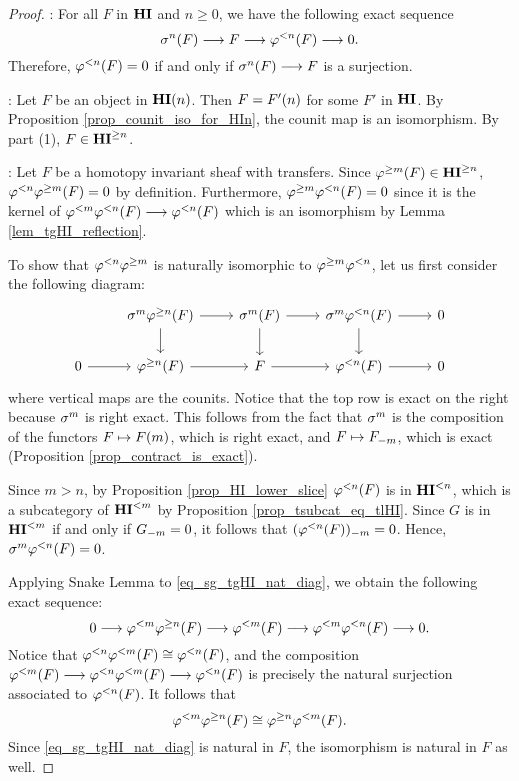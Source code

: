 \begin{proof}
 : For all $F$ in $\HI$ and $n \geq 0$, we have the 
following exact sequence
\[
\sgHI{n}(F) \to F \to \tlHI{n}(F) \to 0.
\]
Therefore, $\tlHI{n}(F) = 0$ if and only if $\sgHI{n}(F) 
\to F$ is a surjection.

 : Let $F$ be an object in $\HI(n)$. Then $F = 
\LHI[n]{F'}$ for some $F'$ in $\HI$. By Proposition 
\ref{prop_counit_iso_for_HIn}, the counit map is an isomorphism. 
By part (1), $F \in \THI{n}$.

 : Let $F$ be a homotopy invariant sheaf with 
transfers. Since $\tgHI{m}(F) \in \THI{n}$, $\tlHI{n} \tgHI{m}(F) 
= 0$ by definition. Furthermore, $\tgHI{m}\tlHI{n}(F) = 0$ since 
it is the kernel of $\tlHI{m} \tlHI{n}(F) \to \tlHI{n}(F)$ 
which is an isomorphism by Lemma \ref{lem_tgHI_reflection}.

To show that $\tlHI{n} \tgHI{m}$ is naturally isomorphic to
$\tgHI{m} \tlHI{n}$, let us first consider the following 
diagram:
\begin{equation}\label{eq_sg_tgHI_nat_diag}
\begin{tikzcd}
{} &
\sgHI{m} \tgHI{n}(F) \arrow{r} \arrow{d} &
\sgHI{m}(F) \arrow{r} \arrow{d} &
\sgHI{m} \tlHI{n}(F) \arrow{r} \arrow{d} &
0 \\
0 \arrow{r} &
\tgHI{n}(F) \arrow{r} &
F \arrow{r} &
\tlHI{n}(F) \arrow{r}&
0
\end{tikzcd}
\end{equation}
where vertical maps are the counits. Notice that the top row is 
exact on the right because $\sgHI{m}$ is right exact. This follows 
from the fact that $\sgHI{m}$ is the composition of the functors 
$F \mapsto \LHI[m]{F}$, which is right exact, and $F \mapsto 
\RHI[m]{F}$, which is exact (Proposition \ref{prop_contract_is_exact}).

Since $m > n$, by Proposition \ref{prop_HI_lower_slice} 
$\tlHI{n}(F)$ is in $\TFHI{n}$, which is a subcategory of $\TFHI{m}$
by Proposition \ref{prop_tsubcat_eq_tlHI}. Since $G$ is in $\TFHI{m}$
if and only if $\RHI[m]{G} = 0$, it follows that 
$\RHI[m]{(\tlHI{n}(F))} = 0$. Hence, $\sgHI{m}\tlHI{n}(F) = 0$. 

Applying Snake Lemma to \eqref{eq_sg_tgHI_nat_diag}, we obtain the 
following exact sequence:
\begin{equation}\label{eq_tlHI_exact_sequence}
0 \to \tlHI{m}\tgHI{n}(F) \to \tlHI{m}(F) \to \tlHI{m} \tlHI{n}(F) 
   \to 0.
\end{equation}
Notice that $\tlHI{n} \tlHI{m}(F) \cong \tlHI{n}(F)$, and the 
composition $\tlHI{m}(F) \to \tlHI{n}\tlHI{m} (F) \to \tlHI{n}(F)$ 
is precisely the natural surjection associated to $\tlHI{n}(F)$. It 
follows that
\[
\tlHI{m} \tgHI{n}(F) \cong \tgHI{n} \tlHI{m}(F).
\]
Since \eqref{eq_sg_tgHI_nat_diag} is natural in $F$, the isomorphism
is natural in $F$ as well.


\end{proof}

